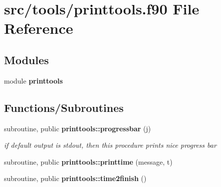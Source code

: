 \section{src/tools/printtools.f90 File Reference}
\label{printtools_8f90}
\subsection*{Modules}
\begin{DoxyCompactItemize}
\item 
module {\bf printtools}
\end{DoxyCompactItemize}
\subsection*{Functions/\+Subroutines}
\begin{DoxyCompactItemize}
\item 
subroutine, public {\bf printtools\+::progressbar} (j)
\begin{DoxyCompactList}\small\item\em if default output is stdout, then this procedure prints nice progress bar \end{DoxyCompactList}\item 
subroutine, public {\bf printtools\+::printtime} (message, t)
\item 
subroutine, public {\bf printtools\+::time2finish} ()
\end{DoxyCompactItemize}
